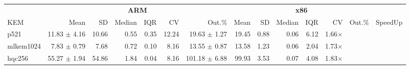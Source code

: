 \begin{table}[!ht]
\centering
\begin{tabular}{l|rrrrrr|rrrrrr|r}
\toprule
& \multicolumn{6}{c}{\bfseries ARM} & \multicolumn{6}{c}{\bfseries x86} & \\
\cmidrule(lr){2-7} \cmidrule(lr){8-13}
KEM & Mean & SD & Median & IQR & CV & Out.\% & Mean & SD & Median & IQR & CV & Out.\% & SpeedUp \\
\midrule
p521 			& 11.83  $\pm$ 4.16 & 10.66 & 0.55 & 0.35 & 12.24 & 19.63 $\pm$ 1.27 & 19.45 & 0.88 & 0.06 & 6.12 & 1.66× \\
mlkem1024 	& 7.83 	  $\pm$ 0.79 & 7.68 & 0.72 & 0.10 & 8.16 & 13.55 $\pm$ 0.87 & 13.58 & 1.23 & 0.06 & 2.04 & 1.73× \\
hqc256 		& 55.27 $\pm$ 1.94 & 54.86 & 1.84 & 0.04 & 8.16 & 101.18 $\pm$ 6.88 & 99.93 & 3.53 & 0.07 & 4.08 & 1.83× \\

\bottomrule
\end{tabular}
\end{table}
